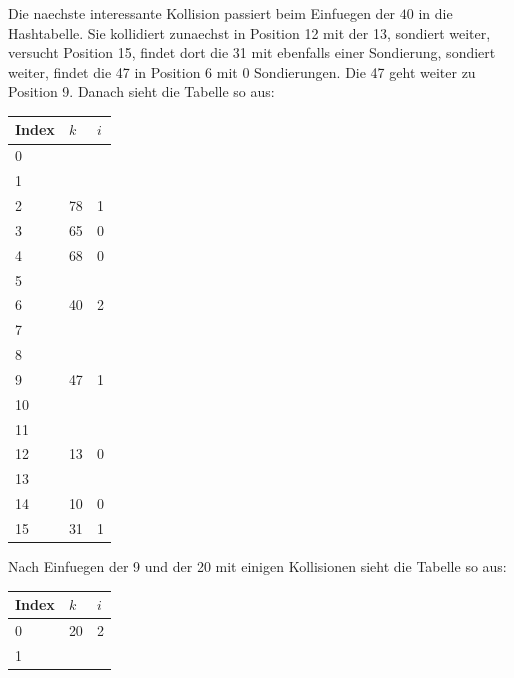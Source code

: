 \documentclass{scrartcl} %
\begin{document}
\begin{aufgabe}
\begin{enumerate}[label=(\alph*)]
\begin{center}
            \end{center}
            Die naechste interessante Kollision passiert beim Einfuegen der $40$ in die Hashtabelle. Sie kollidiert zunaechst in Position 12 mit der 13, sondiert weiter, versucht Position 15, findet dort die 31 mit ebenfalls einer Sondierung, sondiert weiter, findet die 47 in Position 6 mit 0 Sondierungen. Die 47 geht weiter zu Position 9. Danach sieht die Tabelle so aus:
            \begin{center}
                \begin{tabular}{|m{2cm}|m{1cm}<{\centering}|m{1cm}<{\centering}|}
                \hline
                     \rowcolor{teal!60} Index & $k$& $i$\\\hline
                     0 & & \\
                     1 & & \\
                     2 & 78 & 1\\
                     3 & 65 & 0\\
                     4 & 68 & 0\\
                     5 & & \\
                     6 & 40 & 2\\
                     7 & & \\
                     8 & & \\
                     9 & 47 & 1\\
                     10 & & \\
                     11 & & \\
                     12 & 13 & 0\\
                     13 & & \\
                     14 & 10 & 0\\
                     15 & 31 & 1\\\hline 
                \end{tabular}
            \end{center}
            Nach Einfuegen der 9 und der 20 mit einigen Kollisionen sieht die Tabelle so aus:
            \begin{center}
                \begin{tabular}{|m{2cm}|m{1cm}<{\centering}|m{1cm}<{\centering}|}
                \hline
                     \rowcolor{teal!60} Index & $k$& $i$\\\hline
                     0 & 20 & 2\\
                     1 & & \\

\end{tabular}
\end{center}
\end{enumerate}
\end{aufgabe}
\end{document}
